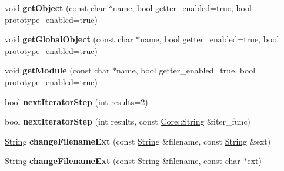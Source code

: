 \begin{DoxyCompactItemize}
\item 
void {\bfseries get\+Object} (const char $\ast$name, bool getter\+\_\+enabled=true, bool prototype\+\_\+enabled=true)\hypertarget{class_object_script_1_1_o_s_a16b591766278e07c176fe598bb8d68bb}{}\label{class_object_script_1_1_o_s_a16b591766278e07c176fe598bb8d68bb}

\item 
void {\bfseries get\+Global\+Object} (const char $\ast$name, bool getter\+\_\+enabled=true, bool prototype\+\_\+enabled=true)\hypertarget{class_object_script_1_1_o_s_a2703673d0afabd5df886034c84cafd5e}{}\label{class_object_script_1_1_o_s_a2703673d0afabd5df886034c84cafd5e}

\item 
void {\bfseries get\+Module} (const char $\ast$name, bool getter\+\_\+enabled=true, bool prototype\+\_\+enabled=true)\hypertarget{class_object_script_1_1_o_s_ac1af08cc316504f3a400be8882078723}{}\label{class_object_script_1_1_o_s_ac1af08cc316504f3a400be8882078723}

\item 
bool {\bfseries next\+Iterator\+Step} (int results=2)\hypertarget{class_object_script_1_1_o_s_a2fc11d0657dae7b86d8df8d4844fda30}{}\label{class_object_script_1_1_o_s_a2fc11d0657dae7b86d8df8d4844fda30}

\item 
bool {\bfseries next\+Iterator\+Step} (int results, const \hyperlink{class_object_script_1_1_o_s_1_1_core_1_1_string}{Core\+::\+String} \&iter\+\_\+func)\hypertarget{class_object_script_1_1_o_s_a0dbd5e556f9f45c6e89b3d07ee821a52}{}\label{class_object_script_1_1_o_s_a0dbd5e556f9f45c6e89b3d07ee821a52}

\item 
\hyperlink{class_object_script_1_1_o_s_1_1_string}{String} {\bfseries change\+Filename\+Ext} (const \hyperlink{class_object_script_1_1_o_s_1_1_string}{String} \&filename, const \hyperlink{class_object_script_1_1_o_s_1_1_string}{String} \&ext)\hypertarget{class_object_script_1_1_o_s_a28c23c29f0b710ee735541a1af59a439}{}\label{class_object_script_1_1_o_s_a28c23c29f0b710ee735541a1af59a439}

\item 
\hyperlink{class_object_script_1_1_o_s_1_1_string}{String} {\bfseries change\+Filename\+Ext} (const \hyperlink{class_object_script_1_1_o_s_1_1_string}{String} \&filename, const char $\ast$ext)\hypertarget{class_object_script_1_1_o_s_a308d1d5f22dec9d3eb6c22c19d573169}{}\label{class_object_script_1_1_o_s_a308d1d5f22dec9d3eb6c22c19d573169}


\end{DoxyCompactItemize}
